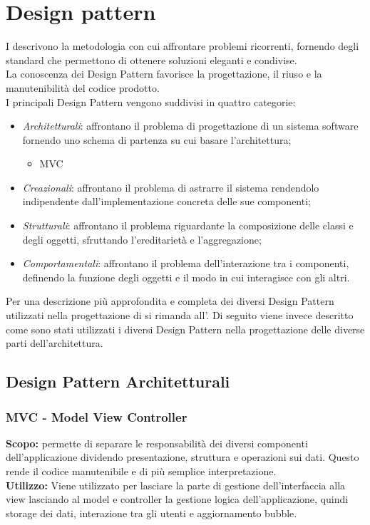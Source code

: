 \section{Design pattern}
I  descrivono la metodologia con cui affrontare problemi ricorrenti, fornendo degli standard che permettono di ottenere soluzioni eleganti e condivise.\\
La conoscenza dei Design Pattern favorisce la progettazione, il riuso e la manutenibilità del codice prodotto.\\
I principali Design Pattern vengono suddivisi in quattro categorie:
\begin{itemize}
	\item \textit{Architetturali}: affrontano il problema di progettazione di un sistema software fornendo uno schema di partenza su cui basare l'architettura;
	\begin{itemize}
		\item{MVC}
	\end{itemize}
	\item \textit{Creazionali}: affrontano il problema di astrarre il sistema rendendolo indipendente dall'implementazione concreta delle sue componenti;
	\item \textit{Strutturali}: affrontano il problema riguardante la composizione delle classi e degli oggetti, sfruttando l'ereditarietà e l'aggregazione;
	\item \textit{Comportamentali}: affrontano il problema dell'interazione tra i componenti, definendo la funzione degli oggetti e il modo in cui interagisce con gli altri.
\end{itemize}
Per una descrizione più approfondita e completa dei diversi Design Pattern utilizzati nella progettazione di \ProjectName{} si rimanda all'. Di seguito viene invece descritto come sono stati utilizzati i diversi Design Pattern nella progettazione delle diverse parti dell'architettura.

\subsection{Design Pattern Architetturali}

\subsubsection{MVC - Model View Controller}
\textbf{Scopo:} permette di separare le responsabilità dei diversi componenti dell'applicazione dividendo presentazione, struttura e operazioni sui dati. Questo rende il codice manutenibile e di più semplice interpretazione.\\
\textbf{Utilizzo:} Viene utilizzato per lasciare la parte di gestione dell'interfaccia alla view lasciando al model e controller la gestione logica dell'applicazione, quindi storage dei dati, interazione tra gli utenti e aggiornamento bubble.

